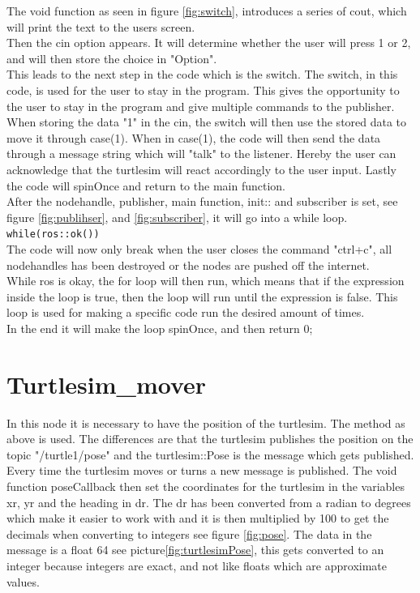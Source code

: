 The void function as seen in figure \ref{fig:switch}, introduces a series of cout, which will print the text to the users screen.\\
Then the cin option appears. It will determine whether the user will press 1 or 2, and will then store the choice in "Option".\\
This leads to the next step in the code which is the switch. The switch, in this code, is used for the user to stay in the program. This gives the opportunity to the user to stay in the program and give multiple commands to the publisher.\\
When storing the data "1" in the cin, the switch will then use the stored data to move it through case(1). When in case(1), the code will then send the data through a message string which will "talk" to the listener. Hereby the user can acknowledge that the turtlesim will react accordingly to the user input. Lastly the code will spinOnce and return to the main function.\\
After the nodehandle, publisher, main function, init:: and subscriber is set, see figure \ref{fig:publihser}, and \ref{fig:subscriber}, it will go into a while loop.\\
\texttt{while(ros::ok())}\\
The code will now only break when the user closes the command "ctrl+c", all nodehandles has been destroyed or the nodes are pushed off the internet.\\
While ros is okay, the for loop will then run, which means that if the expression inside the loop is true, then the loop will run until the expression is false. This loop is used for making a specific code run the desired amount of times.\\
In the end it will make the loop spinOnce, and then return 0;\\

\section{Turtlesim\_mover}
In this node it is necessary to have the position of the turtlesim. The method as above is used. The differences are that the turtlesim publishes the position on the topic "/turtle1/pose" and the turtlesim::Pose is the message which gets published. Every time the turtlesim moves or turns a new message is published. The void function poseCallback then set the coordinates for the turtlesim in the variables xr, yr and the heading in dr. The dr has been converted from a radian to degrees which make it easier to work with and it is then multiplied by 100 to get the decimals when converting to integers see figure \ref{fig:pose}. The data in the message is a float 64 see picture\ref{fig:turtlesimPose}, this gets converted to an integer because integers are exact, and not like floats which are approximate values.\\


